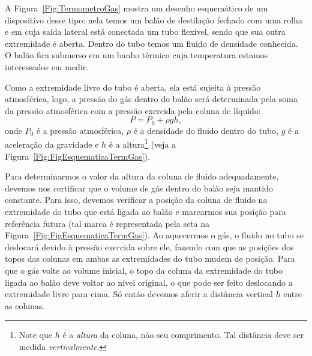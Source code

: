 A Figura~\ref{Fig:TermometroGas} mostra um desenho esquemático de um dispositivo desse tipo: nela temos um balão de destilação fechado com uma rolha e em cuja saída lateral está conectada um tubo flexível, sendo que sua outra extremidade é aberta. Dentro do tubo temos um fluido de densidade conhecida. O balão fica submerso em um banho térmico cuja temperatura estamos interessados em medir.

Como a extremidade livre do tubo é aberta, ela está sujeita à pressão atmosférica, logo, a pressão do gás dentro do balão será determinada pela soma da pressão atmosférica com a pressão exercida pela coluna de líquido:
\begin{equation}
	P = P_0 + \rho g h,
\end{equation}
%
onde $P_0$ é a pressão atmosférica, $\rho$ é a densidade do fluido dentro do tubo, $g$ é a aceleração da gravidade e $h$ é a altura\footnote{Note que $h$ é a \emph{altura} da coluna, não seu comprimento. Tal distância deve ser medida \emph{verticalmente}.} (veja a Figura~\ref{Fig:FigEsquematicaTermGas}).

Para determinarmos o valor da altura da coluna de fluido adequadamente, devemos nos certificar que o volume de gás dentro do balão seja mantido constante. Para isso, devemos verificar a posição da coluna de fluido na extremidade do tubo que está ligada ao balão e marcarmos sua posição para referência futura (tal marca é representada pela seta na Figura~\ref{Fig:FigEsquematicaTermGas}). Ao aquecermos o gás, o fluido no tubo se deslocará devido à pressão exercida sobre ele, fazendo com que as posições dos topos das colunas em ambas as extremidades do tubo  mudem de posição. Para que o gás volte ao volume inicial, o topo da coluna da extremidade do tubo ligada ao balão deve voltar ao nível original, o que pode ser feito deslocando a extremidade livre para cima. Só então devemos aferir a distância vertical $h$ entre as colunas.


